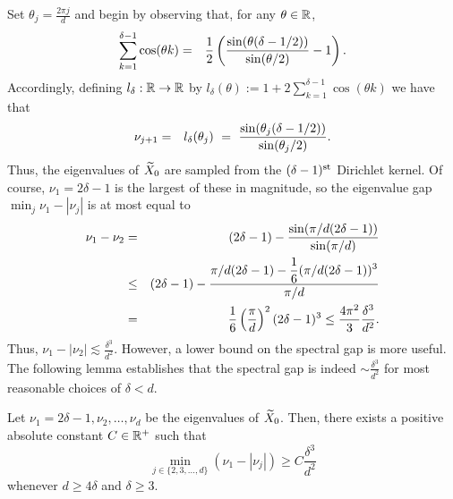 Set $\theta_j = \frac{2 \pi j}{d}$ and begin by observing that, for any $\theta \in \mathbb{R}$,
\begin{eqnarray*}
  \sum_{k = 1}^{\delta - 1}\cos(\theta k) %
  & = & \bigfrac{1}{2}\left(\bigfrac{\sin(\theta(\delta - 1/2))}{\sin(\theta / 2)} - 1\right).
\end{eqnarray*}
Accordingly, defining $l_\delta : \mathbb{R} \to \mathbb{R}$ by $l_\delta(\theta) := 1 + 2\sum_{k=1}^{\delta - 1} \cos(\theta k)$ we have that
\begin{eqnarray}
  \nu_{j+1} %
  & = & l_\delta(\theta_j) ~=~ \bigfrac{\sin(\theta_j(\delta - 1/2))}{\sin(\theta_j / 2)}. \label{equ:EigenFormula}
\end{eqnarray}
Thus, the eigenvalues of $\widetilde{X}_0$ are sampled from the $(\delta-1)^{\rm st}$ Dirichlet kernel.  
Of course, $\nu_1 = 2\delta - 1$ is the largest of these in magnitude, so the eigenvalue gap $\min_j \nu_1 - |\nu_j|$ is at most equal to
\begin{eqnarray*}
  \nu_1 - \nu_2 & = & (2\delta -  1) - \frac{\displaystyle \sin(\pi / d (2\delta - 1))}{\displaystyle \sin(\pi / d)} \\
  & \le & (2 \delta - 1) - \frac{\displaystyle \pi / d(2 \delta - 1) - \frac{1}{6}(\pi / d (2 \delta - 1))^3}{\displaystyle \pi / d} \\
  & = & \frac{1}{6}\left(\frac{\pi}{d}\right)^2(2 \delta - 1)^3 \le \frac{4\pi^2}{3} \frac{\delta^3}{d^2} \label{equ:gap12}.
\end{eqnarray*}
Thus, $\nu_1 - |\nu_2 | \lesssim \frac{\delta^3}{d^2}$.  However, a lower bound on the spectral gap is more useful.  The following lemma establishes that the spectral gap is indeed $\sim \frac{\delta^3}{d^2}$ for most reasonable choices of $\delta < d$.

\begin{lemma}
Let $\nu_1 = 2 \delta -1, \nu_2, \dots, \nu_d$ be the eigenvalues of $\widetilde{X}_0$.  Then, there exists a positive absolute constant $C \in \mathbb{R}^+$ such that
$$\min_{j \in \{2, 3, \dots, d \} } (\nu_1 - |\nu_j| ) \geq C \frac{\delta^3}{d^2}$$
whenever $d \geq 4\delta$ and $\delta \geq 3$. %
\label{lem:EigGap}
\end{lemma}

